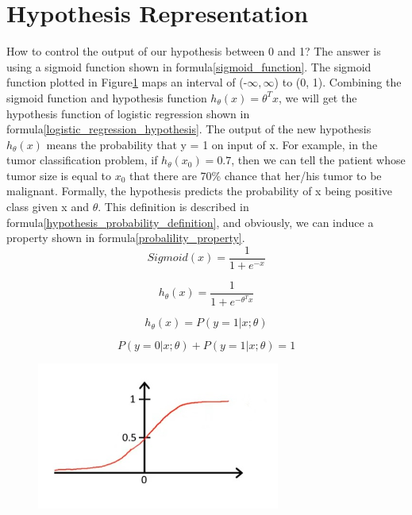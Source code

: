\documentclass{article}
\begin{document}
\section{Hypothesis Representation}
How to control the output of our hypothesis between 0 and 1? The answer is using a sigmoid function shown in formula\ref{sigmoid_function}. The sigmoid function plotted in Figure\ref{sigmoid_function_plotting} maps an interval of (-$\infty, \infty$) to (0, 1). Combining the sigmoid function and hypothesis function $h_{\theta}(x) = \theta^{T}x$, we will get the hypothesis function of logistic regression shown in formula\ref{logistic_regression_hypothesis}. The output of the new hypothesis $h_{\theta}(x)$  means the probability that y = 1 on input of x. For example, in the tumor classification problem, if $h_{\theta}(x_{0}) = 0.7$, then we can tell the patient whose tumor size is equal to $x_{0}$ that there are 70\% chance that her/his tumor to be malignant. Formally, the hypothesis predicts the probability of x being positive class given x and $\theta$. This definition is described in formula\ref{hypothesis_probability_definition}, and obviously, we can induce a property shown in formula\ref{probalility_property}.
\begin{equation}\label{sigmoid_function}
Sigmoid(x) = \frac{1}{1 + e^{-x}}
\end{equation}

\begin{equation}\label{logistic_regression_hypothesis}
h_{\theta}(x) = \frac{1}{1 + e^{-\theta^{T}x}}
\end{equation}

\begin{equation}\label{hypothesis_probability_definition}
h_{\theta}(x) = P(y = 1|x;\theta)
\end{equation}

\begin{equation}\label{probalility_property}
P(y = 0|x;\theta) + P(y = 1|x;\theta) = 1
\end{equation}
\begin{figure}[ht]
  \centering
  \includegraphics[width=8cm]{Figure2.jpg}\\
  \caption{}\label{sigmoid_function_plotting}
\end{figure}
\end{document}

